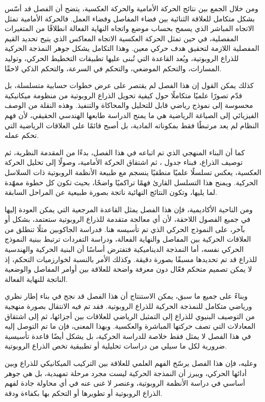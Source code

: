 ومن خلال الجمع بين نتائج الحركة الأمامية والحركة العكسية، يتضح أن الفصل قد أسّس بشكل متكامل للعلاقة الثنائية بين فضاء المفاصل وفضاء العمل. فالحركة الأمامية تمثل الاتجاه المباشر الذي يسمح بحساب موضع واتجاه النهاية الفعالة انطلاقًا من المتغيرات المفصلية، في حين تمثل الحركة العكسية الاتجاه المعاكس الذي يتيح تحديد القيم المفصلية اللازمة لتحقيق هدف حركي معين. وهذا التكامل يشكل جوهر النمذجة الحركية للذراع الروبوتية، ويُعد القاعدة التي تُبنى عليها تطبيقات التخطيط الحركي، وتوليد المسارات، والتحكم الموضعي، والتحكم في السرعة، والتحكم الذكي لاحقًا.

كذلك يمكن القول إن هذا الفصل لم يقتصر على عرض خطوات حسابية متسلسلة، بل قدّم تصورًا علميًا متكاملًا حول كيفية تحويل الذراع الروبوتية من منظومة ميكانيكية محسوسة إلى نموذج رياضي قابل للتحليل والمحاكاة والتنفيذ. وهذه النقلة من الوصف الفيزيائي إلى الصياغة الرياضية هي ما يمنح الدراسة طابعها الهندسي الحقيقي، لأن فهم النظام لم يعد مرتبطًا فقط بمكوناته المادية، بل أصبح قائمًا على العلاقات الرياضية التي تحكم عمله.

كما أن البناء المنهجي الذي تم اتباعه في هذا الفصل، بدءًا من المقدمة النظرية، ثم توصيف الذراع، فبناء جدول ، ثم اشتقاق الحركة الأمامية، وصولًا إلى تحليل الحركة العكسية، يعكس تسلسلًا علميًا منطقيًا ينسجم مع طبيعة الأنظمة الروبوتية ذات السلاسل الحركية. ويمنح هذا التسلسل القارئ فهمًا تراكميًا واضحًا، بحيث تكون كل خطوة ممهّدة لما يليها، وتكون النتائج النهائية ناتجة بصورة طبيعية عن المراحل السابقة.

ومن الناحية الأكاديمية، فإن هذا الفصل يمثل القاعدة المرجعية التي يمكن العودة إليها في جميع الفصول اللاحقة، لأن أي معالجة متقدمة للذراع الروبوتية ستعتمد، بشكل أو بآخر، على النموذج الحركي الذي تم تأسيسه هنا. فدراسة الجاكوبين مثلًا تنطلق من العلاقات الحركية بين المفاصل والنهاية الفعالة، ودراسة التفردات ترتبط ببنية النموذج الحركي نفسه، أما النمذجة الديناميكية فتفترض أساسًا أن البنية الحركية والهندسية للذراع قد تم تحديدها مسبقًا بصورة دقيقة. وكذلك الأمر بالنسبة لخوارزميات التحكم، إذ لا يمكن تصميم متحكم فعّال دون معرفة واضحة للعلاقة بين أوامر المفاصل والوضعية الناتجة للنهاية الفعالة.

وبناءً على جميع ما سبق، يمكن الاستنتاج أن هذا الفصل قد نجح في بناء إطار نظري ورياضي متكامل للنمذجة الحركية للذراع الروبوتية. فقد تم فيه الانتقال بصورة منهجية من التوصيف البنيوي للذراع إلى التمثيل الرياضي للعلاقات بين أجزائها، ثم إلى اشتقاق المعادلات التي تصف حركتها المباشرة والعكسية. وبهذا المعنى، فإن ما تم التوصل إليه في هذا الفصل لا يمثل فقط خلاصة للدراسة الحركية، بل يشكل أيضًا قاعدة تأسيسية ضرورية لكل ما سيلي من دراسات تحليلية أو تطبيقية تخص الذراع الروبوتية.

وعليه، فإن هذا الفصل يرسّخ الفهم العلمي للعلاقة بين التركيب الميكانيكي للذراع وبين أدائها الحركي، ويبرز أن النمذجة الحركية ليست مجرد مرحلة تمهيدية، بل هي جوهر أساسي في دراسة الأنظمة الروبوتية، وعنصر لا غنى عنه في أي محاولة جادة لفهم الذراع الروبوتية أو تطويرها أو التحكم بها بكفاءة ودقة.